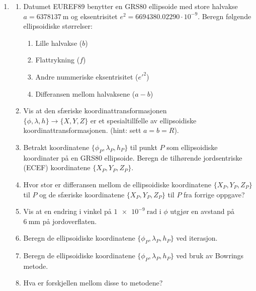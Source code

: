 \documentclass[a4paper, norsk, 11pt, twoside]{article}
\begin{document}
\begin{enumerate}
\textit{Ellipsoidiske koordinater}
\item
  \begin{enumerate}
  \item Datumet EUREF89 benytter en GRS80 ellipsoide med store halvakse $a=\SI{6378137}{\meter}$ og eksentrisitet $e^{2}=6694380.02290 \cdot 10^{-9}$. Beregn følgende ellipsoidiske størrelser:
  \begin{enumerate}
    \item Lille halvakse ($b$)
    \item Flattrykning ($f$)
    \item Andre nummeriske eksentrisitet ($e'^{2}$)
    \item Differansen mellom halvaksene ($a-b$)
  \end{enumerate}
  \item Vis at den sfæriske koordinattransformasjonen\\ $\{\phi,\lambda,h\} \rightarrow \{X,Y,Z\}$ er et spesialtillfelle av ellipsoidiske koordinattransformasjonen. (hint: sett $a=b=R$).
  \item Betrakt koordinatene $\{\phi_{P},\lambda_{P},h_{P}\}$ til punkt $P$ som ellipsoidiske koordinater på en GRS80 ellipsoide. Beregn de tilhørende jordsentriske (ECEF) koordinatene $\{X_{P},Y_{P},Z_{P}\}$.
  \item Hvor stor er differansen mellom de ellipsoidiske koordinatene $\{X_{P},Y_{P},Z_{P}\}$ til $P$ og de sfæriske koordinatene $\{X_{P},Y_{P},Z_{P}\}$ til $P$ fra forrige oppgave?
  \item Vis at en endring i vinkel på $\SI{1e-9}{\radian}$ i $\phi$ utgjør en avstand på $\SI{6}{\milli\meter}$ på jordoverflaten.
  \item Beregn de ellipsoidiske koordinatene $\{\phi_{P},\lambda_{P},h_{P}\}$ ved iterasjon.
  \item Beregn de ellipsoidiske koordinatene $\{\phi_{P},\lambda_{P},h_{P}\}$ ved bruk av Bowrings metode.
  \item Hva er forskjellen mellom disse to metodene?
  \end{enumerate}
\end{enumerate}
\end{document}

